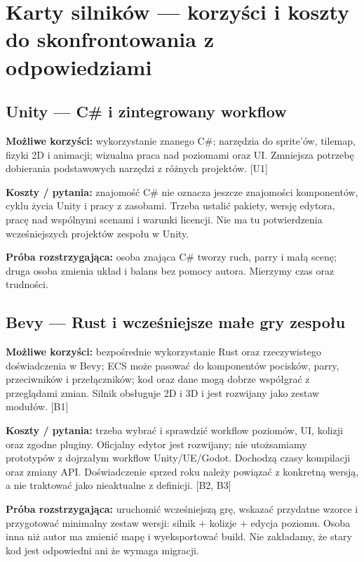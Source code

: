 \documentclass[10pt,a4paper]{article}
\begin{document}
\clearpage
\section*{Karty silników — korzyści i koszty do skonfrontowania z odpowiedziami}


\subsection*{Unity — C\# i zintegrowany workflow}


\textbf{Możliwe korzyści:} wykorzystanie znanego C\#; narzędzia do sprite'ów, tilemap, fizyki 2D i animacji; wizualna praca nad poziomami oraz UI. Zmniejsza potrzebę dobierania podstawowych narzędzi z różnych projektów. [U1]



\textbf{Koszty / pytania:} znajomość C\# nie oznacza jeszcze znajomości komponentów, cyklu życia Unity i pracy z zasobami. Trzeba ustalić pakiety, wersję edytora, pracę nad wspólnymi scenami i warunki licencji. Nie ma tu potwierdzenia wcześniejszych projektów zespołu w Unity.



\textbf{Próba rozstrzygająca:} osoba znająca C\# tworzy ruch, parry i małą scenę; druga osoba zmienia układ i balans bez pomocy autora. Mierzymy czas oraz trudności.



\subsection*{Bevy — Rust i wcześniejsze małe gry zespołu}


\textbf{Możliwe korzyści:} bezpośrednie wykorzystanie Rust oraz rzeczywistego doświadczenia w Bevy; ECS może pasować do komponentów pocisków, parry, przeciwników i przełączników; kod oraz dane mogą dobrze współgrać z przeglądami zmian. Silnik obsługuje 2D i 3D i jest rozwijany jako zestaw modułów. [B1]



\textbf{Koszty / pytania:} trzeba wybrać i sprawdzić workflow poziomów, UI, kolizji oraz zgodne pluginy. Oficjalny edytor jest rozwijany; nie utożsamiamy prototypów z dojrzałym workflow Unity/UE/Godot. Dochodzą czasy kompilacji oraz zmiany API. Doświadczenie sprzed roku należy powiązać z konkretną wersją, a nie traktować jako nieaktualne z definicji. [B2, B3]



\textbf{Próba rozstrzygająca:} uruchomić wcześniejszą grę, wskazać przydatne wzorce i przygotować minimalny zestaw wersji: silnik + kolizje + edycja poziomu. Osoba inna niż autor ma zmienić mapę i wyeksportować build. Nie zakładamy, że stary kod jest odpowiedni ani że wymaga migracji.
\end{document}
